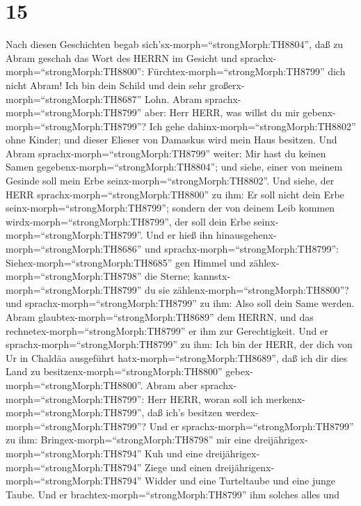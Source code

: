 \hypertarget{section-14}{%
\section{15}\label{section-14}}

 Nach diesen Geschichten begab
sich'sx-morph=``strongMorph:TH8804'', daß zu Abram geschah das Wort des
HERRN im Gesicht und sprachx-morph=``strongMorph:TH8800'':
Fürchtex-morph=``strongMorph:TH8799'' dich nicht Abram! Ich bin dein
Schild und dein sehr großerx-morph=``strongMorph:TH8687'' Lohn.
 Abram sprachx-morph=``strongMorph:TH8799'' aber: Herr HERR,
was willst du mir gebenx-morph=``strongMorph:TH8799''? Ich gehe
dahinx-morph=``strongMorph:TH8802'' ohne Kinder; und dieser Elieser von
Damaskus wird mein Haus besitzen.  Und Abram
sprachx-morph=``strongMorph:TH8799'' weiter: Mir hast du keinen Samen
gegebenx-morph=``strongMorph:TH8804''; und siehe, einer von meinem
Gesinde soll mein Erbe seinx-morph=``strongMorph:TH8802''. 
Und siehe, der HERR sprachx-morph=``strongMorph:TH8800'' zu ihm: Er soll
nicht dein Erbe seinx-morph=``strongMorph:TH8799''; sondern der von
deinem Leib kommen wirdx-morph=``strongMorph:TH8799'', der soll dein
Erbe seinx-morph=``strongMorph:TH8799''.  Und er hieß ihn
hinausgehenx-morph=``strongMorph:TH8686'' und
sprachx-morph=``strongMorph:TH8799'':
Siehex-morph=``strongMorph:TH8685'' gen Himmel und
zählex-morph=``strongMorph:TH8798'' die Sterne;
kannstx-morph=``strongMorph:TH8799'' du sie
zählenx-morph=``strongMorph:TH8800''? und
sprachx-morph=``strongMorph:TH8799'' zu ihm: Also soll dein Same werden.
 Abram glaubtex-morph=``strongMorph:TH8689'' dem HERRN, und
das rechnetex-morph=``strongMorph:TH8799'' er ihm zur Gerechtigkeit.
 Und er sprachx-morph=``strongMorph:TH8799'' zu ihm: Ich bin
der HERR, der dich von Ur in Chaldäa ausgeführt
hatx-morph=``strongMorph:TH8689'', daß ich dir dies Land zu
besitzenx-morph=``strongMorph:TH8800''
gebex-morph=``strongMorph:TH8800''.  Abram aber
sprachx-morph=``strongMorph:TH8799'': Herr HERR, woran soll ich
merkenx-morph=``strongMorph:TH8799'', daß ich's besitzen
werdex-morph=``strongMorph:TH8799''?  Und er
sprachx-morph=``strongMorph:TH8799'' zu ihm:
Bringex-morph=``strongMorph:TH8798'' mir eine
dreijährigex-morph=``strongMorph:TH8794'' Kuh und eine
dreijährigex-morph=``strongMorph:TH8794'' Ziege und einen
dreijährigenx-morph=``strongMorph:TH8794'' Widder und eine Turteltaube
und eine junge Taube.  Und er
brachtex-morph=``strongMorph:TH8799'' ihm solches alles und
